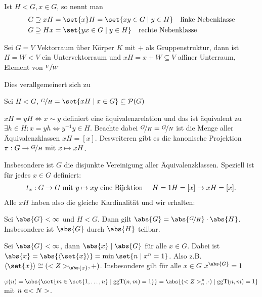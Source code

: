 \begin{definition}
	Ist $H < G, x \in G$, so nennt man
	\begin{align*}
	G \supseteq x H &= \set{x}H = \set{xy \in G \mid y \in H} \quad \text{linke Nebenklasse}\\
	G \supseteq H x &= \set{yx \in G \mid y \in H} \quad \text{rechte Nebenklasse}
	\end{align*}
\end{definition}
\begin{example}
	Sei $G = V$ Vektorraum über Körper $K$ mit $+$ als Gruppenstruktur, dann ist $H = W < V$ ein Untervektorraum und $xH = x + W \subseteq V$ affiner Unterraum, Element von $\lnkset{V}{W}$
\end{example}
Dies verallgemeinert sich zu
\begin{definition}
	Sei $H < G$, $\lnkset{G}{H} = \set{x H \mid x \in G} \subseteq \powerset(G)$
\end{definition}
\begin{remark}
	$xH = yH \Leftrightarrow x \sim y$ definiert eine äquivalenzrelation und das ist äquivalent zu $\exists h \in H: x = yh \Leftrightarrow y^{-1}y \in H$. Beachte dabei $\lnkset{G}{H} = \lnkset{G}{N}$ ist die Menge aller Äquivalenzklassen $xH = [x]$. Desweiteren gibt es die kanonische Projektion $\pi : G \to \lnkset{G}{H} \mit x \mapsto xH$.
\end{remark}
Insbesondere ist $G$ die disjunkte Vereinigung aller Äquivalenzklassen. Speziell ist für jedes $x \in G$ definiert:
\begin{align*}
	t_x : G \to G \mit y \mapsto xy \text{ eine Bijektion } \quad H = 1H = [x] \to xH = [x].
\end{align*}
Alle $xH$ haben also die gleiche Kardinalität und wir erhalten:
\begin{proposition}
	Sei $\abs{G} < \infty$ und $H < G$. Dann gilt $\abs{G} = \abs{\lnkset{G}{H}}\cdot \abs{H}$. Insbesondere ist $\abs{G}$ durch $\abs{H}$ teilbar.
\end{proposition}
\begin{conclusion}
	Sei $\abs{G} < \infty$, dann $\abs{x} \mid \abs{G}$ für alle $x \in G$. Dabei ist $\abs{x} = \abs{\langle \set{x}\rangle} = \min\set{n \mid x^n = 1}$. Also z.B. $\langle \set{x} \rangle \cong (\Z_{\abs{x}},+)$. Insbesondere gilt für alle $x \in G$ $x^{\abs{G}} = 1$
\end{conclusion}
\begin{conclusion}
	$\phi(n) = \abs{\set{m \in \set{1, \dots,n} \mid \ggT(n,m) = 1}} = \abs{(\Z_n^{\times}, \cdot) \mid \ggT(n,m) = 1}$ mit $n \in \N$.
\end{conclusion}
